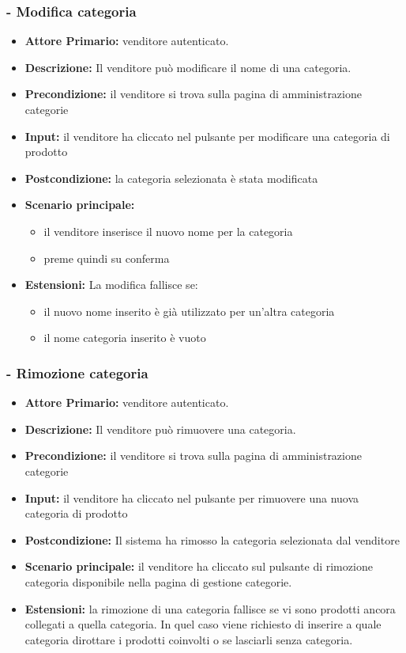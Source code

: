 \subsubsection{- Modifica categoria}
\begin{itemize}
    \item \textbf{Attore Primario:}  venditore autenticato.
    \item \textbf{Descrizione:}  Il venditore può modificare il nome di una categoria.
    \item \textbf{Precondizione:} il venditore si trova sulla pagina di amministrazione categorie
    \item \textbf{Input:} il venditore ha cliccato nel pulsante per modificare una categoria di prodotto
    \item \textbf{Postcondizione:} la categoria selezionata è stata modificata
    \item \textbf{Scenario principale:}
    \begin{itemize}
        \item il venditore inserisce il nuovo nome per la categoria
        \item preme quindi su conferma
    \end{itemize}
    \item \textbf{Estensioni:} La modifica fallisce se:
    \begin{itemize}
        \item il nuovo nome inserito è già utilizzato per un'altra categoria
        \item il nome categoria inserito è vuoto
    \end{itemize}
\end{itemize}

\stepsubUserCase
\subsubsection{- Rimozione categoria}
\begin{itemize}
    \item \textbf{Attore Primario:}  venditore autenticato.
    \item \textbf{Descrizione:}  Il venditore può rimuovere una categoria.
    \item \textbf{Precondizione:} il venditore si trova sulla pagina di amministrazione categorie
    \item \textbf{Input:} il venditore ha cliccato nel pulsante per rimuovere una nuova categoria di prodotto
    \item \textbf{Postcondizione:} Il sistema ha rimosso la categoria selezionata dal venditore
    \item \textbf{Scenario principale:} il venditore ha cliccato sul pulsante di rimozione categoria disponibile nella pagina di gestione categorie. 
    \item \textbf{Estensioni:} la rimozione di una categoria fallisce se vi sono prodotti ancora collegati a quella categoria. In quel caso viene richiesto
                                di inserire a quale categoria dirottare i prodotti coinvolti o se lasciarli senza categoria.
\end{itemize}

